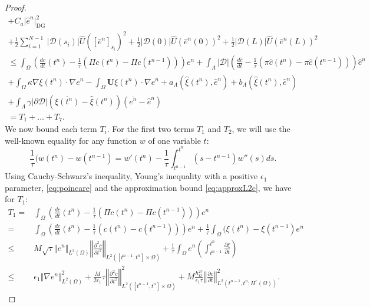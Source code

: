 \documentclass[pdflatex,sn-mathphys-num]{sn-jnl}%
\newcommand{\bfU}{{\boldsymbol U}}
\newcommand{\DG}{\mathrm{DG}}
\theoremstyle{thmstyleone}%
\theoremstyle{thmstyletwo}%
\theoremstyle{thmstylethree}%
\begin{document}
\begin{proof}
\begin{align*}
+ C_a \vert \hat e^n \vert_{\DG}^2
\nonumber\\
+\frac12 \sum_{i=1}^{N-1}  \ \vert \mathcal{D}(s_i)\vert \hat U ([\hat e^n]_{s_i})^2
+\frac12 \vert \mathcal{D}(0)\vert \hat U (\hat e^n(0))^2
 +\frac12 \vert \mathcal{D}(L)\vert \hat U (\hat e^n(L))^2
 \nonumber\\
     \leq  \int_\Omega \left(\frac{d c}{dt}(t^n) -\frac{1}{\tau} (\Pi c(t^{n})- \Pi c(t^{n-1})) \right) e^n
+  \int_\Lambda |\mathcal{D}| \left( \frac{d \hat c}{d t} - \frac{1}{\tau} (\pi\hat c(t^n) - \pi\hat c(t^{n-1}))\right) \hat e^n
\nonumber\\
 +   \int_\Omega  \kappa \nabla \xi(t^{n}) \cdot \nabla e^n
      - \int_\Omega \bfU \xi(t^{n}) \cdot \nabla e^n 
    + a_\Lambda(\hat \xi(t^{n}), \hat e^n)
    + b_\Lambda(\hat \xi(t^{n}), \hat e^n)\nonumber\\
      +\int_\Lambda\gamma \vert \partial\mathcal{D}\vert \left(\overline{\xi(t^{n})}-\hat{\xi}(t^{n})\right)
 (\overline{e^n} - \hat e^n)
\\
= T_1 + \dots + T_7.
\end{align*}
We now bound each term $T_i$.  For the first two terms $T_1$ and $T_2$, we will use the well-known equality for any function $w$ of one variable $t$:
\[
\frac{1}{\tau}(w(t^n)-w(t^{n-1})
= w'(t^n)-\frac{1}{\tau}\int_{t^{n-1}}^{t^n} (s-t^{n-1}) w''(s) ds.
\]
Using Cauchy-Schwarz's inequality, Young's inequality with a positive $\epsilon_1$ parameter, \eqref{eq:poincare} and the approximation bound \eqref{eq:approxL2c}, we have for $T_1$:
\begin{align*}
T_1 = & \int_\Omega \left(\frac{d c}{dt}(t^n) -\frac{1}{\tau} (\Pi c(t^{n})- \Pi c(t^{n-1})) \right) e^n\\
= & \int_\Omega \left(\frac{d c}{dt}(t^n) -\frac{1}{\tau} (c(t^{n})- c(t^{n-1})) \right) e^n
+ \frac{1}{\tau} \int_\Omega (\xi(t^n)-\xi(t^{n-1}) e^n
\\
\leq &  M \sqrt{\tau} \Vert e^n\Vert_{L^2(\Omega)}
\left\Vert \frac{\partial^2 c}{\partial t^2}\right\Vert_{L^2([t^{n-1},t^n]\times \Omega)}
+ \frac{1}{\tau} \int_\Omega e^n \left(\int_{t^{n-1}}^{t^n}
\frac{\partial \xi}{\partial t}\right)
\\
\leq & \epsilon_1 \Vert \nabla e^n\Vert_{L^2(\Omega)}^2
+ \frac{M}{2 \epsilon_1} \tau \left\Vert \frac{\partial^2 c}{\partial t^2}\right\Vert_{L^2([t^{n-1},t^n]\times \Omega)}^2
+ M \frac{h_\Omega^{2r}}{\epsilon_1 \tau} \left\Vert \frac{\partial c}{\partial t}\right\Vert_{L^2(t^{n-1},t^n;H^r(\Omega))}^2.
\end{align*}

\end{proof}
\end{document}
